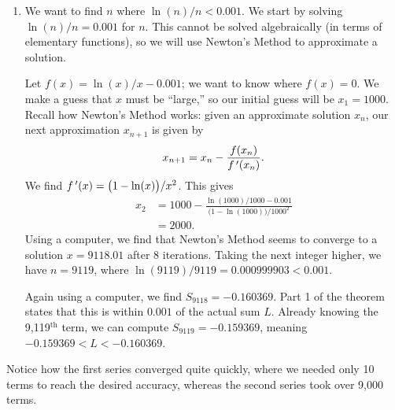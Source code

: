 {\begin{enumerate}
	\item		We want to find $n$ where $\ln (n)/n < 0.001$. We start by solving $\ln (n)/n = 0.001$ for $n$. This cannot be solved algebraically (in terms of elementary functions), so we will use Newton's Method to approximate a solution. 
	
	Let $f(x) = \ln(x)/x-0.001$; we want to know where $f(x) = 0$. We make a guess that $x$ must be ``large,'' so our initial guess will be $x_1=1000$. Recall how Newton's Method works: given an approximate solution $x_n$, our next approximation $x_{n+1}$ is given by
	$$x_{n+1} = x_n - \frac{f(x_n)}{f\,'(x_n)}.$$
	We find $f\,'(x) = \big(1-\ln(x)\big)/x^2$. This gives
	\begin{align*}
	x_2 &= 1000 - \frac{\ln(1000)/1000-0.001}{\big(1-\ln(1000)\big)/1000^2} \\
			&= 2000.
	\end{align*}
	Using a computer, we find that Newton's Method seems to converge to a solution $x=9118.01$ after 8 iterations. Taking the next integer higher, we have $n=9119$, where $\ln(9119)/9119 =0.000999903<0.001$.
	
	Again using a computer, we find $S_{9118} = -0.160369$. Part 1 of the theorem states that this is within $0.001$ of the actual sum $L$. Already knowing the 9,119$^\text{th}$ term, we can compute $S_{9119} = -0.159369$, meaning $-0.159369 < L < -0.160369$. 
	
\end{enumerate}
Notice how the first series converged quite quickly, where we needed only 10 terms to reach the desired accuracy, whereas the second series took over 9,000 terms.
}\\

